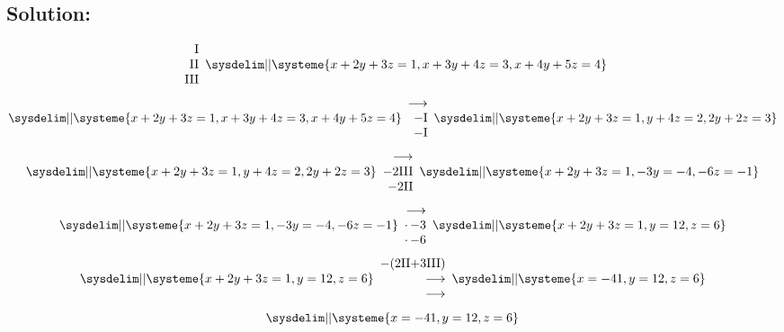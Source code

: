 \documentclass{article}
\begin{document}
\subsection*{Solution:}
\begin{equation}
    \begin{array}{rr}
        $I$ \\ $II$ \\ $III$
    \end{array}
    \sysdelim||\systeme{
        x + 2y + 3z = 1 ,
        x + 3y + 4z = 3 ,
        x + 4y + 5z = 4
    }
\end{equation}
\begin{equation}
    \sysdelim||\systeme{
        x + 2y + 3z = 1 ,
        x + 3y + 4z = 3 ,
        x + 4y + 5z = 4
    }
    \begin{array}{rr}
        \longrightarrow \\
        -$I$ \\
        -$I$ \\
    \end{array}
    \sysdelim||\systeme{
        x + 2y + 3z = 1 ,
        y + 4z = 2 ,
        2y + 2z = 3
    }
\end{equation}
\begin{equation}
    \sysdelim||\systeme{
        x + 2y + 3z = 1 ,
        y + 4z = 2 ,
        2y + 2z = 3
    }
    \begin{array}{rr}
        \longrightarrow \\
        -2$III$ \\
        -2$II$ \\
    \end{array}
    \sysdelim||\systeme{
        x + 2y + 3z = 1 ,
        -3y = -4 ,
        -6z = -1
    }
\end{equation}
\begin{equation}
    \sysdelim||\systeme{
        x + 2y + 3z = 1 ,
        -3y = -4 ,
        -6z = -1
    }
    \begin{array}{rr}
        \longrightarrow \\
        \cdot \,{-3} \\
        \cdot \,{-6} \\
    \end{array}
    \sysdelim||\systeme{
        x + 2y + 3z = 1 ,
        y = 12 ,
        z = 6
    }
\end{equation}
\begin{equation}
    \sysdelim||\systeme{
        x + 2y + 3z = 1 ,
        y = 12 ,
        z = 6
    }
    \begin{array}{rr}
        - (2$II$ + 3$III$)\\
        \longrightarrow \\
        \longrightarrow \\
    \end{array}
    \sysdelim||\systeme{
        x = -41,
        y = 12, 
        z = 6
    }
\end{equation}
\begin{equation}
    \sysdelim||\systeme{
        x = -41,
        y = 12, 
        z = 6
    }
\end{equation}
\end{document}
